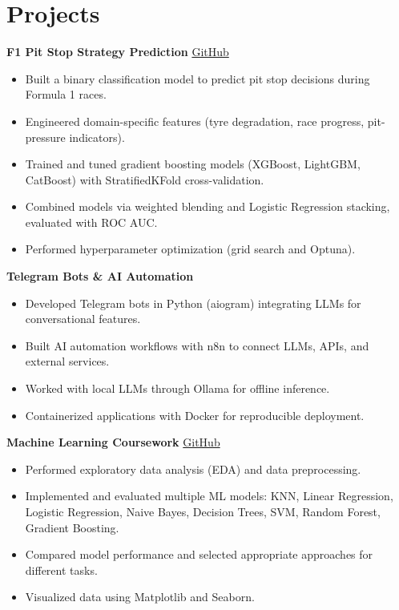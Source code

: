 \documentclass[a4paper,11pt]{article}
\begin{document}
\section{Projects}
\textbf{F1 Pit Stop Strategy Prediction}
\hfill
\href{https://github.com/rmkaaaa}{GitHub}
\begin{itemize}[leftmargin=1.2em, itemsep=2pt]
    \item Built a binary classification model to predict pit stop decisions during Formula 1 races.
    \item Engineered domain-specific features (tyre degradation, race progress, pit-pressure indicators).
    \item Trained and tuned gradient boosting models (XGBoost, LightGBM, CatBoost) with StratifiedKFold cross-validation.
    \item Combined models via weighted blending and Logistic Regression stacking, evaluated with ROC AUC.
    \item Performed hyperparameter optimization (grid search and Optuna).
\end{itemize}
\vspace{4pt}
\textbf{Telegram Bots \& AI Automation}
\begin{itemize}[leftmargin=1.2em, itemsep=2pt]
    \item Developed Telegram bots in Python (aiogram) integrating LLMs for conversational features.
    \item Built AI automation workflows with n8n to connect LLMs, APIs, and external services.
    \item Worked with local LLMs through Ollama for offline inference.
    \item Containerized applications with Docker for reproducible deployment.
\end{itemize}
\vspace{4pt}
\textbf{Machine Learning Coursework}
\hfill
\href{https://github.com/rmkaaaa/ml-course-homework}{GitHub}
\begin{itemize}[leftmargin=1.2em, itemsep=2pt]
    \item Performed exploratory data analysis (EDA) and data preprocessing.
    \item Implemented and evaluated multiple ML models: KNN, Linear Regression, Logistic Regression, Naive Bayes, Decision Trees, SVM, Random Forest, Gradient Boosting.
    \item Compared model performance and selected appropriate approaches for different tasks.
    \item Visualized data using Matplotlib and Seaborn.
\end{itemize}
\end{document}
